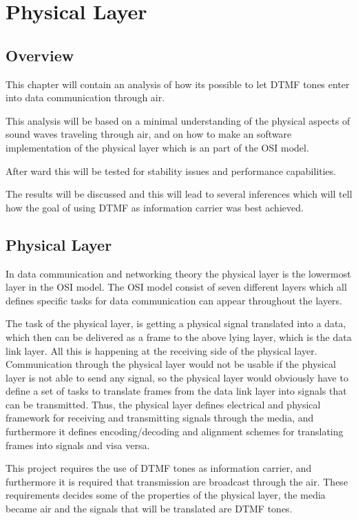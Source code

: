 \section{Physical Layer}

	\subsection{Overview}
	This chapter will contain an analysis of how its possible to let DTMF tones
	enter into data communication through air.
	
	This analysis will be based on a minimal understanding of the physical aspects
	of sound waves traveling through air, and on how to make an software
	implementation of the physical layer which is an part of the OSI model.
	
	After ward this will be tested for stability issues and performance capabilities.
	
	The results will be discussed and this will lead to several inferences which will
	tell how the goal of using DTMF as information carrier was best achieved.
	
	\subsection{Physical Layer}
	In data communication and networking theory the physical layer is the lowermost
	layer in the OSI model. The OSI model consist of seven different layers which all
	defines specific tasks for data communication can appear throughout the layers.
	
	The task of the physical layer, is getting a physical signal translated into a data, which
	then can be delivered as a frame to the above lying layer, which is the data link layer.
	All this is happening at the receiving side of the physical layer. Communication through
	the physical layer would not be usable if the physical layer is not able to send any signal,
	so the physical layer would obviously have to define a set of tasks to translate frames from
	the data link layer into signals that can be transmitted. Thus, the physical layer defines
	electrical and physical framework for receiving and transmitting signals through the media,
	and furthermore it defines encoding/decoding and alignment schemes for translating
	frames into signals and visa versa.
	
	This project requires the use of DTMF tones as information carrier, and furthermore it is
	required that transmission are broadcast through the air. These requirements decides some
	of the properties of the physical layer, the media became air and the signals that will be
	translated are DTMF tones.
	
